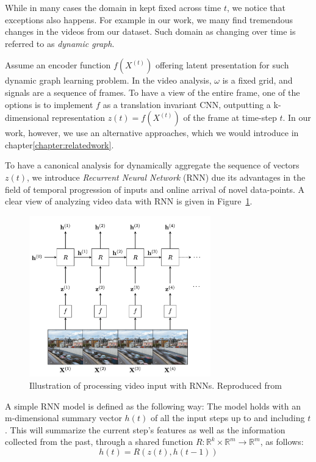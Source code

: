     While in many cases the domain in kept fixed across time $t$, we notice that exceptions also happens. For example in our work, we many find tremendous changes in the videos from our dataset. Such domain as changing over time is referred to as \textit{dynamic graph}\cite{rossi2006temporal,xu2020inductive}.

    Assume an encoder function $f(X^(t))$ offering latent presentation for such dynamic graph learning problem. In the video analysis, $\omega$ is a fixed grid, and signals are a sequence of frames. To have a view of the entire frame, one of the options is to implement $f$ as a translation invariant CNN, outputting a k-dimensional representation $z(t)=f(X^(t))$  of the frame at time-step $t$. In our work, however, we use an alternative approaches, which we would introduce in chapter\ref{chapter:relatedwork}.

    To have a canonical analysis for dynamically aggregate the sequence of vectors $z(t)$, we introduce \textit{Recurrent Neural Network} (RNN)\cite{schmidt2019recurrent} due its advantages in the field of temporal progression of inputs and online arrival of novel data-points. A clear view of analyzing video data with RNN is given in Figure~\ref{fig:RNN}.

    \begin{figure}[h]
        \centering
        \includegraphics[width=0.7\textwidth]{figures/02_RNN.png}
        \caption{Illustration of processing video input with RNNs. Reproduced from \cite{10.48550/arxiv.2104.13478}}
        \label{fig:RNN}
    \end{figure}

    A simple RNN model is defined as the following way: The model holds with an m-dimensional summary vector $h(t)$ of all the input steps up to and including $t$. This will summarize the current step's features as well as the information collected from the past, through a shared function $R: \mathbb{R} ^k \times \mathbb{R} ^m \rightarrow \mathbb{R} ^m$, as follows:
    \[
        h(t) = R(z(t), h(t-1))
    \]

